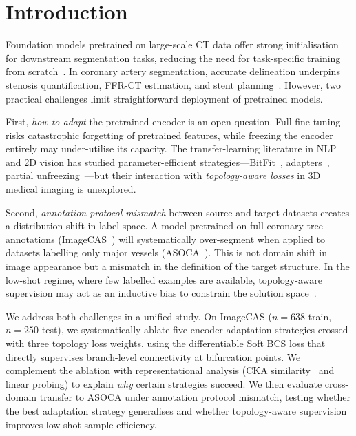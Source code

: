 \documentclass[runningheads]{llncs}
\begin{document}
\section{Introduction}

Foundation models pretrained on large-scale CT data offer strong initialisation for downstream segmentation tasks, reducing the need for task-specific training from scratch~\cite{pai_ctfm_2025,huang_stu_2023}.
In coronary artery segmentation, accurate delineation underpins stenosis quantification, FFR-CT estimation, and stent planning~\cite{lin_deep_2022}.
However, two practical challenges limit straightforward deployment of pretrained models.

First, \emph{how to adapt} the pretrained encoder is an open question.
Full fine-tuning risks catastrophic forgetting of pretrained features, while freezing the encoder entirely may under-utilise its capacity.
The transfer-learning literature in NLP and 2D vision has studied parameter-efficient strategies---BitFit~\cite{zaken_bitfit_2022}, adapters~\cite{houlsby_adapters_2019}, partial unfreezing~\cite{lee_surgical_2023}---but their interaction with \emph{topology-aware losses} in 3D medical imaging is unexplored.

Second, \emph{annotation protocol mismatch} between source and target datasets creates a distribution shift in label space.
A model pretrained on full coronary tree annotations (ImageCAS~\cite{zeng_imagecas_2023}) will systematically over-segment when applied to datasets labelling only major vessels (ASOCA~\cite{gharleghi_asoca_2022}).
This is not domain shift in image appearance but a mismatch in the definition of the target structure.
In the low-shot regime, where few labelled examples are available, topology-aware supervision may act as an inductive bias to constrain the solution space~\cite{shit_cldice_2021,hu_topology_2019,clough_topological_2022}.

We address both challenges in a unified study.
On ImageCAS ($n{=}638$ train, $n{=}250$ test), we systematically ablate five encoder adaptation strategies crossed with three topology loss weights, using the differentiable Soft BCS loss that directly supervises branch-level connectivity at bifurcation points.
We complement the ablation with representational analysis (CKA similarity~\cite{kornblith_cka_2019} and linear probing) to explain \emph{why} certain strategies succeed.
We then evaluate cross-domain transfer to ASOCA under annotation protocol mismatch, testing whether the best adaptation strategy generalises and whether topology-aware supervision improves low-shot sample efficiency.
\end{document}
